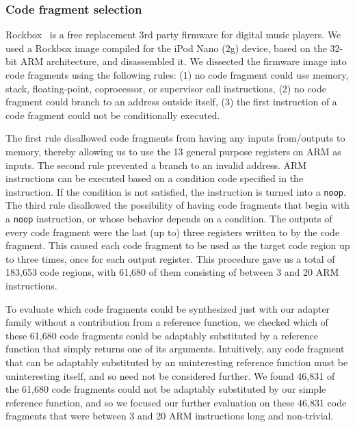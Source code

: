 \subsubsection{Code fragment selection}
Rockbox~\cite{rockbox} is a free replacement 3rd party firmware for digital music players.
%
We used a Rockbox image compiled for the iPod Nano (2g) device, based on the 32-bit ARM architecture, and disassembled it.
%
We dissected the firmware image into code fragments using the following rules:
%
(1) no code fragment could use memory, stack, floating-point, coprocessor, or supervisor call instructions,
%
(2) no code fragment could branch to an address outside itself,
%
(3) the first instruction of a code fragment could not be conditionally executed.

The first rule disallowed code fragments from having any inputs from/outputs to memory, thereby allowing us to use the 13 general purpose registers on ARM as inputs.
%
The second rule prevented a branch to an invalid address.
%
ARM instructions can be executed based on a condition code specified in the instruction. If the condition is not satisfied, the instruction is turned into a {\tt noop}.
%
The third rule disallowed the possibility of having code fragments that begin with a {\tt noop} instruction, or whose behavior depends on a condition.
%
The outputs of every code fragment were the last (up to) three registers written to by the code fragment.
%
This caused each code fragment to be used as the target code region up to three times, once for each output register.
%
This procedure gave us a total of 183,653 code regions, with 61,680 of them consisting of between 3 and 20 ARM instructions.

To evaluate which code fragments could be synthesized just with our
adapter family without a contribution from a reference function, we
checked
which of these 61,680 code fragments could be adaptably substituted by a reference function that simply returns one of its arguments.
%
Intuitively, any code fragment that can be adaptably substituted by an
uninteresting reference function must be uninteresting itself, and so
need not be considered further.
%
We found 46,831 of the 61,680 code fragments could not be adaptably
substituted by our simple reference function, and so we focused our
further evaluation on these 46,831 code fragments that were between 3
and 20 ARM instructions long and non-trivial.\\
%
